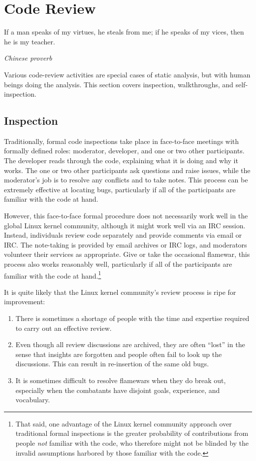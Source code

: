 \section{Code Review}
\label{sec:debugging:Code Review}
%
\epigraph{If a man speaks of my virtues, he steals from me;
	  if he speaks of my vices, then he is my teacher.}
	 {\emph{Chinese proverb}}

Various code-review activities are special cases of static analysis, but
with human beings doing the analysis.
This section covers inspection, walkthroughs, and self-inspection.

\subsection{Inspection}
\label{sec:debugging:Inspection}

Traditionally, formal code inspections take place in face-to-face meetings
with formally defined roles: moderator, developer, and one or two other
participants.
The developer reads through the code, explaining what it is doing and
why it works.
The one or two other participants ask questions and raise issues, while
the moderator's job is to resolve any conflicts and to take notes.
This process can be extremely effective at locating bugs, particularly
if all of the participants are familiar with the code at hand.

However, this face-to-face formal procedure does not necessarily
work well in the global Linux kernel community, although it might work
well via an IRC session.
Instead, individuals review code separately and provide comments via
email or IRC.
The note-taking is provided by email archives or IRC logs, and moderators
volunteer their services as appropriate.
Give or take the occasional flamewar, this process also works reasonably
well, particularly if all of the participants are familiar with the
code at hand.\footnote{
	That said, one advantage of the Linux kernel community approach
	over traditional formal inspections is the greater probability of
	contributions from people \emph{not} familiar with the code,
	who therefore might not be blinded by the invalid assumptions
	harbored by those familiar with the code.}

It is quite likely that the Linux kernel community's review process
is ripe for improvement:

\begin{enumerate}
\item	There is sometimes a shortage of people with the time and
	expertise required to carry out an effective review.
\item	Even though all review discussions are archived, they are
	often ``lost'' in the sense that insights are forgotten and
	people often fail to look up the discussions.
	This can result in re-insertion of the same old bugs.
\item	It is sometimes difficult to resolve flamewars when they do
	break out, especially when the combatants have disjoint
	goals, experience, and vocabulary.
\end{enumerate}

